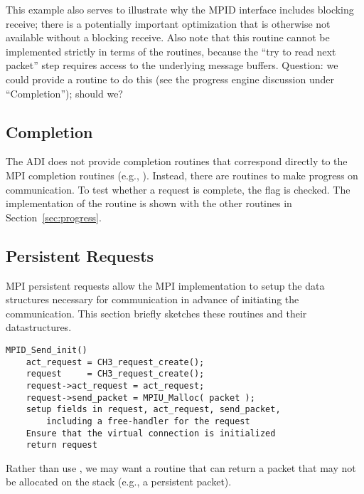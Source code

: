 \documentclass{article}
\def\mpids#1#2{\code{#2}\index{#1!#2}}
\begin{document}
This example also serves to illustrate why the MPID interface includes
blocking receive; there is a potentially important optimization that
is otherwise not available without a blocking receive.  Also note that
this routine cannot be implemented strictly 
in terms of the  routines, because the ``try to read next
packet'' step requires access to the underlying message buffers.  
Question: we could provide a routine to do this (see the progress engine
discussion under ``Completion''); should we?

\subsection{Completion}
The ADI does not provide completion routines that correspond directly
to the MPI completion routines (e.g., ).  Instead,
there are routines to make progress on communication.  To test whether
a request is complete, the \mpids{MPID_Request}{busy} flag is checked.
The implementation of the  routine is shown with the other
 routines in Section~\ref{sec:progress}.



\subsection{Persistent Requests}
MPI persistent requests allow the MPI implementation to setup the data
structures necessary for communication in advance of initiating the
communication.  This section briefly sketches these routines and their
datastructures. 

\begin{verbatim}
MPID_Send_init()
    act_request = CH3_request_create();
    request     = CH3_request_create();
    request->act_request = act_request;
    request->send_packet = MPIU_Malloc( packet );
    setup fields in request, act_request, send_packet, 
        including a free-handler for the request
    Ensure that the virtual connection is initialized
    return request   
\end{verbatim}
Rather than use , we may want a  routine that can
return a packet that may not be allocated on the stack (e.g., a persistent
packet).  
\end{document}
